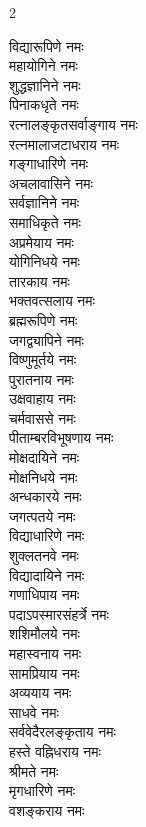 \begin{multicols}{2}
\begin{flushleft}
विद्यारूपिणे नमः\\
महायोगिने नमः\\
शुद्धज्ञानिने नमः\\
पिनाकधृते नमः\\
रत्नालङ्कृतसर्वाङ्गाय नमः\\
रत्नमालाजटाधराय नमः\\
गङ्गाधारिणे नमः\\
अचलावासिने नमः\\
सर्वज्ञानिने नमः\\
समाधिकृते नमः \hfill {}\\
अप्रमेयाय नमः\\
योगिनिधये नमः\\
तारकाय नमः\\
भक्तवत्सलाय नमः\\
ब्रह्मरूपिणे नमः\\
जगद्व्यापिने नमः\\
विष्णुमूर्तये नमः\\
पुरातनाय नमः\\
उक्षवाहाय नमः\\
चर्मवाससे नमः \hfill {}\\
पीताम्बरविभूषणाय नमः\\
मोक्षदायिने नमः\\
मोक्षनिधये नमः\\
अन्धकारये नमः\\
जगत्पतये नमः\\
विद्याधारिणे नमः\\
शुक्लतनवे नमः\\
विद्यादायिने नमः\\
गणाधिपाय नमः\\
पदाऽपस्मारसंहर्त्रे नमः \hfill {}\\
शशिमौलये नमः\\
महास्वनाय नमः\\
सामप्रियाय नमः\\
अव्ययाय नमः\\
साधवे नमः\\
सर्ववेदैरलङ्कृताय नमः\\
हस्ते वह्निधराय नमः\\
श्रीमते नमः\\
मृगधारिणे नमः\\
वशङ्कराय नमः \hfill {}\\

\end{flushleft}
\end{multicols}
